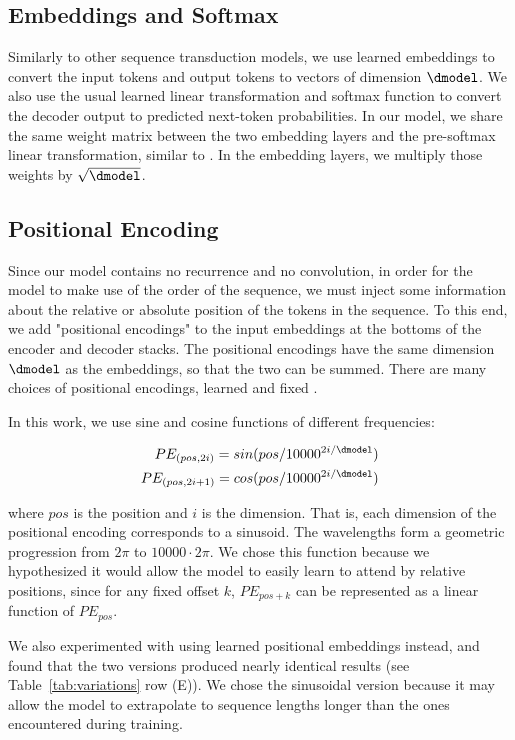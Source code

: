   \subsection{Embeddings and Softmax}
  Similarly to other sequence transduction models, we use learned embeddings to convert the input tokens and output tokens to vectors of dimension $\dmodel$.  We also use the usual learned linear transformation and softmax function to convert the decoder output to predicted next-token probabilities.  In our model, we share the same weight matrix between the two embedding layers and the pre-softmax linear transformation, similar to \citep{press2016using}.   In the embedding layers, we multiply those weights by $\sqrt{\dmodel}$.


  \subsection{Positional Encoding}
  Since our model contains no recurrence and no convolution, in order for the model to make use of the order of the sequence, we must inject some information about the relative or absolute position of the tokens in the sequence.  To this end, we add "positional encodings" to the input embeddings at the bottoms of the encoder and decoder stacks.  The positional encodings have the same dimension $\dmodel$ as the embeddings, so that the two can be summed.   There are many choices of positional encodings, learned and fixed \citep{JonasFaceNet2017}.

  In this work, we use sine and cosine functions of different frequencies:

  \begin{align*}
      PE_{(pos,2i)} = sin(pos / 10000^{2i/\dmodel}) \\
      PE_{(pos,2i+1)} = cos(pos / 10000^{2i/\dmodel})
  \end{align*}

  where $pos$ is the position and $i$ is the dimension.  That is, each dimension of the positional encoding corresponds to a sinusoid.  The wavelengths form a geometric progression from $2\pi$ to $10000 \cdot 2\pi$.  We chose this function because we hypothesized it would allow the model to easily learn to attend by relative positions, since for any fixed offset $k$, $PE_{pos+k}$ can be represented as a linear function of $PE_{pos}$.

  We also experimented with using learned positional embeddings \citep{JonasFaceNet2017} instead, and found that the two versions produced nearly identical results (see Table~\ref{tab:variations} row (E)).  We chose the sinusoidal version because it may allow the model to extrapolate to sequence lengths longer than the ones encountered during training.



